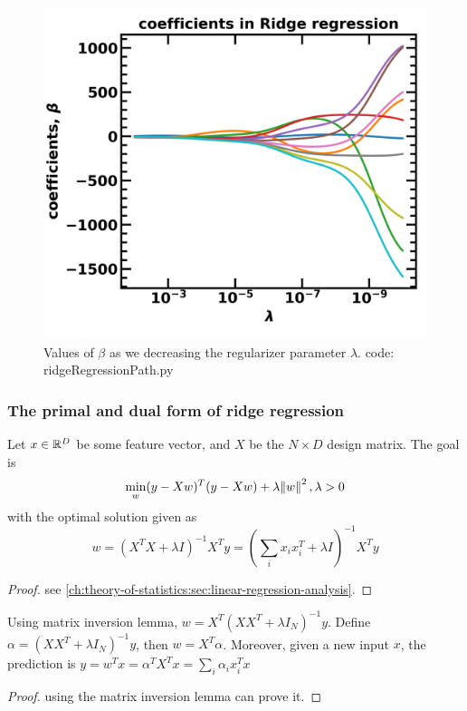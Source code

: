 \begin{refsection}
\begin{figure}[H]
\centering
\includegraphics[width=0.6\linewidth]{../figures/statisticalLearning/linearModelRegression/ridgeCoefficientPath}
\caption{Values of $\beta$ as we decreasing the regularizer parameter $\lambda$. code: ridgeRegressionPath.py}
\label{fig:ridgeCoefficientPath}
\end{figure}


\subsubsection{The primal and dual form of ridge regression}

\begin{lemma}
\cite[494]{murphy2012machine}Let $x\in \mathbb{R}^D$ be some feature vector, and $X$ be the $N\times D$ design matrix. The goal is
$$\min_{w} (y - Xw)^T(y - Xw) + \lambda \norm{w}^2,\lambda > 0$$
with the optimal solution given as
$$w = (X^TX + \lambda I)^{-1} X^Ty = (\sum_i x_ix_i^T + \lambda I)^{-1} X^Ty$$
\end{lemma}
\begin{proof}
see \autoref{ch:theory-of-statistics:sec:linear-regression-analysis}.	
\end{proof}


\begin{lemma}
\cite[494]{murphy2012machine}
Using matrix inversion lemma, $w = X^T(XX^T + \lambda I_N)^{-1}y$. Define $\alpha = (XX^T + \lambda I_N)^{-1}y$, then $w = X^T\alpha$. Moreover, given a new input $x$, 
the prediction is $y = w^T x = \alpha^T X^T x = \sum_{i} \alpha_i x^T_i x$
\end{lemma}
\begin{proof}
using the matrix inversion lemma can prove it.	
\end{proof}
 


\end{refsection}
